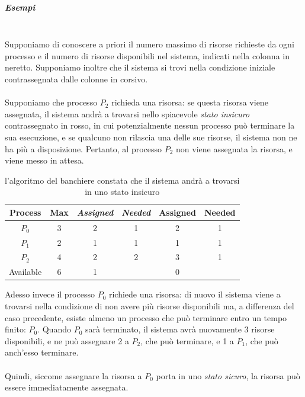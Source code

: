 \documentclass[12pt,a4paper]{article}
\begin{document}
\subparagraph{Esempi}\mbox{}\\
Supponiamo di conoscere a priori il numero massimo di risorse richieste
da ogni processo e il numero di risorse disponibili nel sistema, indicati
nella colonna in neretto.
Supponiamo inoltre che il sistema si trovi nella condizione iniziale contrassegnata
dalle colonne in corsivo.
\\ \\
Supponiamo che processo $P_2$ richieda una risorsa: se questa risorsa
viene assegnata, il sistema andrà a trovarsi nello spiacevole
\emph{stato insicuro} contrassegnato in rosso, in cui potenzialmente nessun
processo può terminare la sua esecuzione, e se qualcuno non rilascia una
delle sue risorse, il sistema non ne ha più a disposizione.
Pertanto, al processo $P_2$ non viene assegnata la risorsa, e viene messo in attesa.

\begin{table}[H]
\centering
\begin{tabular}{c | c | c c | c c }
  Process   & \textbf{Max}  & \emph{Assigned}  & \emph{Needed}  & Assigned  & Needed  \\ \hline
  $P_0$     & 3             & 2         & 1                     & {\color{red} 2} & {\color{red} 1} \\
  $P_1$     & 2             & 1         & 1                     & {\color{red} 1} & {\color{red} 1} \\
  $P_2$     & 4             & 2         & 2                     & {\color{red} 3} & {\color{red} 1} \\ \hline
  Available & 6             & 1         &                       & {\color{red} 0} & \\
\end{tabular}
\caption{l'algoritmo del banchiere constata che il sistema andrà a trovarsi in uno stato insicuro}
\end{table}

Adesso invece il processo $P_0$ richiede una risorsa: di nuovo il sistema
viene a trovarsi nella condizione di non avere più risorse disponibili ma,
a differenza del caso precedente, esiste almeno un processo che può terminare
entro un tempo finito: $P_0$.
Quando $P_0$ sarà terminato, il sistema avrà nuovamente 3 risorse disponibili,
e ne può assegnare 2 a $P_2$, che può terminare, e 1 a $P_1$, che può
anch'esso terminare.
\\ \\
Quindi, siccome assegnare la risorsa a $P_0$ porta in uno \emph{stato sicuro},
la risorsa può essere immediatamente assegnata.
\end{document}
